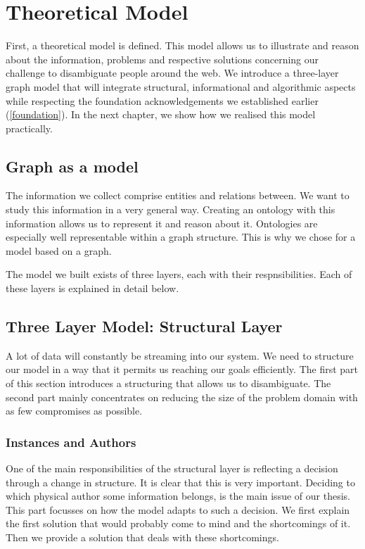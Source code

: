 \chapter{Theoretical Model}

First, a theoretical model is defined. This model allows us to illustrate and reason about the information, problems and respective solutions concerning our challenge to disambiguate people around the web. We introduce a three-layer graph model that will integrate structural, informational and algorithmic aspects while respecting the foundation acknowledgements we established earlier (\autoref{foundation}). In the next chapter, we show how we realised this model practically.

\section{Graph as a model}

The information we collect comprise entities and relations between. We want to study this information in a very general way. Creating an ontology with this information allows us to represent it and reason about it. Ontologies are especially well representable within a graph structure. This is why we chose for a model based on a graph.

The model we built exists of three layers, each with their respnsibilities. Each of these layers is explained in detail below.

\section{Three Layer Model: Structural Layer}

A lot of data will constantly be streaming into our system. We need to structure our model in a way that it permits us reaching our goals efficiently. The first part of this section introduces a structuring that allows us to disambiguate. The second part mainly concentrates on reducing the size of the problem domain with as few compromises as possible.

\subsection{Instances and Authors}

One of the main responsibilities of the structural layer is reflecting a decision through a change in structure. It is clear that this is very important. Deciding to which physical author some information belongs, is the main issue of our thesis. This part focusses on how the model adapts to such a decision. We first explain the first solution that would probably come to mind and the shortcomings of it. Then we provide a solution that deals with these shortcomings.

